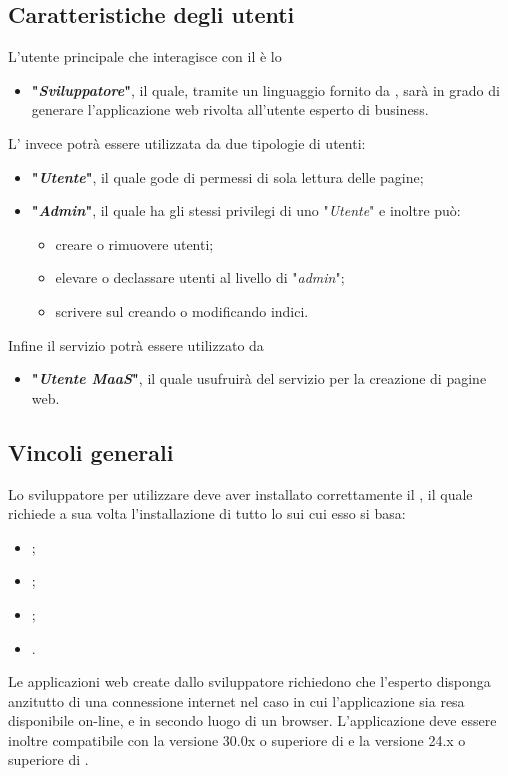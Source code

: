 	\subsection{Caratteristiche degli utenti}
	L'utente principale che interagisce con il  è lo
	\begin{itemize}
		\item \textbf{"\textit{Sviluppatore}"}, il quale, tramite un linguaggio  fornito da \ProjectName{}, sarà in grado di generare l'applicazione web rivolta all'utente esperto di business.
	\end{itemize}		
	 
	L' invece potrà essere utilizzata da due tipologie di utenti:
	\begin{itemize}
		\item \textbf{"\textit{Utente}"}, il quale gode di permessi di sola lettura delle pagine;
		\item \textbf{"\textit{Admin}"}, il quale ha gli stessi privilegi di uno "\textit{Utente}" e inoltre può:
		\begin{itemize}
			\item creare o rimuovere utenti;
			\item elevare o declassare utenti al livello di "\textit{admin}";
			\item scrivere sul  creando o modificando indici.
		\end{itemize}		 	
	\end{itemize}

Infine il servizio  potrà essere utilizzato da
	\begin{itemize}
		\item \textbf{"\textit{Utente MaaS}"}, il quale usufruirà del servizio per la creazione di pagine web.
	\end{itemize}
		
	\subsection{Vincoli generali}
	Lo sviluppatore per utilizzare \ProjectName{} deve aver installato correttamente il , il quale richiede a sua volta l'installazione di tutto lo  sui cui esso si basa:
	\begin{itemize}
		\item \textbf{};
		\item \textbf{};
		\item \textbf{};
		\item \textbf{}.
	\end{itemize}
	Le applicazioni web create dallo sviluppatore richiedono che l'esperto  disponga anzitutto di una connessione internet nel caso in cui l'applicazione sia resa disponibile on-line, e in secondo luogo di un browser. L'applicazione deve essere inoltre compatibile con la versione 30.0x o superiore di  e la versione 24.x o superiore di .